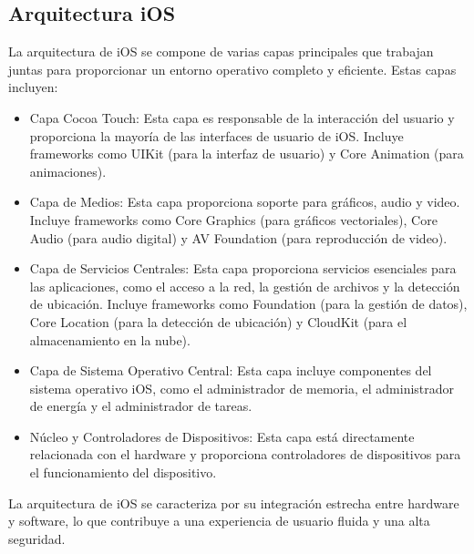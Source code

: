 \documentclass[11pt,twoside]{book}
\begin{document}
\subsection{Arquitectura iOS}
La arquitectura de iOS se compone de varias capas principales que trabajan juntas para proporcionar un entorno operativo completo y eficiente. Estas capas incluyen:
\begin{itemize}
  

  \item Capa Cocoa Touch: Esta capa es responsable de la interacción del usuario y proporciona la mayoría de las interfaces de usuario de iOS. Incluye frameworks como UIKit (para la interfaz de usuario) y Core Animation (para animaciones).

  \item Capa de Medios: Esta capa proporciona soporte para gráficos, audio y video. Incluye frameworks como Core Graphics (para gráficos vectoriales), Core Audio (para audio digital) y AV Foundation (para reproducción de video).

  \item Capa de Servicios Centrales: Esta capa proporciona servicios esenciales para las aplicaciones, como el acceso a la red, la gestión de archivos y la detección de ubicación. Incluye frameworks como Foundation (para la gestión de datos), Core Location (para la detección de ubicación) y CloudKit (para el almacenamiento en la nube).

  \item Capa de Sistema Operativo Central: Esta capa incluye componentes del sistema operativo iOS, como el administrador de memoria, el administrador de energía y el administrador de tareas.

  \item Núcleo y Controladores de Dispositivos: Esta capa está directamente relacionada con el hardware y proporciona controladores de dispositivos para el funcionamiento del dispositivo.
\end{itemize}
La arquitectura de iOS se caracteriza por su integración estrecha entre hardware y software, lo que contribuye a una experiencia de usuario fluida y una alta seguridad.
\end{document}
